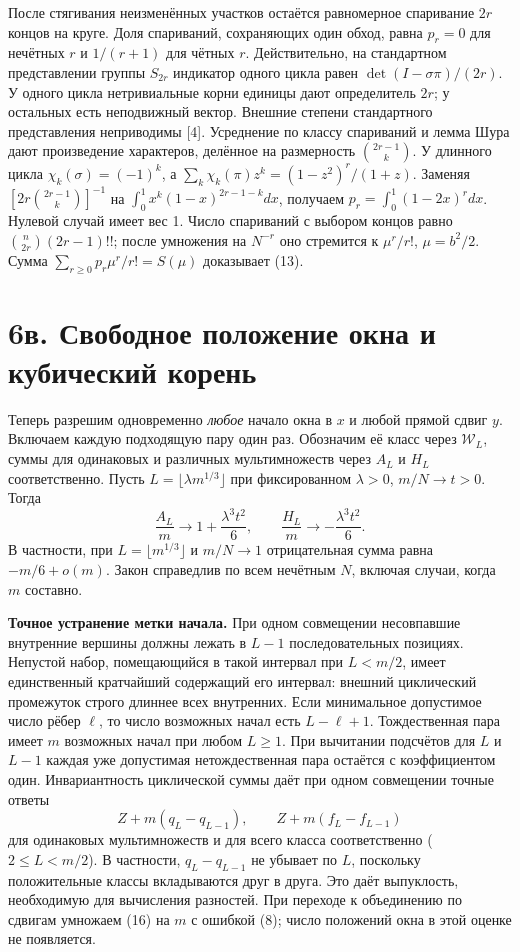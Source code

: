 \documentclass[11pt,a4paper]{article}
\newcommand{\sect}[1]{\section*{\sffamily\color{ink}#1}}
\newcommand{\subt}[1]{\par\medskip\noindent\textbf{#1.}\quad}
\begin{document}
После стягивания неизменённых участков остаётся равномерное спаривание $2r$ концов на круге. Доля спариваний, сохраняющих один обход, равна $p_r=0$ для нечётных $r$ и $1/(r+1)$ для чётных $r$. Действительно, на стандартном представлении группы $S_{2r}$ индикатор одного цикла равен $\det(I-\sigma\pi)/(2r)$. У одного цикла нетривиальные корни единицы дают определитель $2r$; у остальных есть неподвижный вектор. Внешние степени стандартного представления неприводимы [4]. Усреднение по классу спариваний и лемма Шура дают произведение характеров, делённое на размерность $\binom{2r-1}k$. У длинного цикла $\chi_k(\sigma)=(-1)^k$, а $\sum_k\chi_k(\pi)z^k=(1-z^2)^r/(1+z)$. Заменяя $[2r\binom{2r-1}k]^{-1}$ на $\int_0^1 x^k(1-x)^{2r-1-k}dx$, получаем $p_r=\int_0^1(1-2x)^r dx$. Нулевой случай имеет вес 1. Число спариваний с выбором концов равно $\binom n{2r}(2r-1)!!$; после умножения на $N^{-r}$ оно стремится к $\mu^r/r!$, $\mu=b^2/2$. Сумма $\sum_{r\ge0}p_r\mu^r/r!=S(\mu)$ доказывает (13).
\newpage
\sect{6в. Свободное положение окна и кубический корень}
Теперь разрешим одновременно \emph{любое} начало окна в $x$ и любой прямой сдвиг $y$. Включаем каждую подходящую пару один раз. Обозначим её класс через $\mathcal W_L$, суммы для одинаковых и различных мультимножеств через $A_L$ и $H_L$ соответственно. Пусть $L=\lfloor\lambda m^{1/3}\rfloor$ при фиксированном $\lambda>0$, $m/N\to t>0$. Тогда
\[
 \boxed{\displaystyle
     \frac{A_L}{m}\to 1+\frac{\lambda^3 t^2}{6},\qquad
     \frac{H_L}{m}\to-\frac{\lambda^3 t^2}{6}.}                            \tag{15}
\]
В частности, при $L=\lfloor m^{1/3}\rfloor$ и $m/N\to1$ отрицательная сумма равна $-m/6+o(m)$. Закон справедлив по всем нечётным $N$, включая случаи, когда $m$ составно.

\subt{Точное устранение метки начала} При одном совмещении несовпавшие внутренние вершины должны лежать в $L-1$ последовательных позициях. Непустой набор, помещающийся в такой интервал при $L<m/2$, имеет единственный кратчайший содержащий его интервал: внешний циклический промежуток строго длиннее всех внутренних. Если минимальное допустимое число рёбер $\ell$, то число возможных начал есть $L-\ell+1$. Тождественная пара имеет $m$ возможных начал при любом $L\ge1$. При вычитании подсчётов для $L$ и $L-1$ каждая уже допустимая нетождественная пара остаётся с коэффициентом один. Инвариантность циклической суммы даёт при одном совмещении точные ответы
\[
    Z+m(q_L-q_{L-1}),\qquad Z+m(f_L-f_{L-1})                                \tag{16}
\]
для одинаковых мультимножеств и для всего класса соответственно ($2\le L<m/2$). В частности, $q_L-q_{L-1}$ не убывает по $L$, поскольку положительные классы вкладываются друг в друга. Это даёт выпуклость, необходимую для вычисления разностей. При переходе к объединению по сдвигам умножаем (16) на $m$ с ошибкой (8); число положений окна в этой оценке не появляется.
\end{document}
